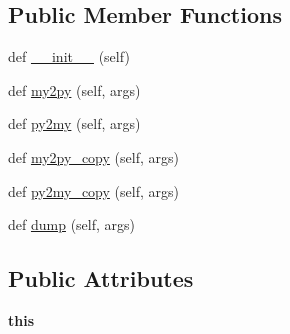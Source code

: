 \subsection*{Public Member Functions}
\begin{DoxyCompactItemize}
\item 
def \hyperlink{classMontePython__cxx_1_1Convert__QickArray_a248fc9cad31385be9c478b1db0440e61}{\+\_\+\+\_\+init\+\_\+\+\_\+} (self)
\item 
def \hyperlink{classMontePython__cxx_1_1Convert__QickArray_a6042af47f1612c75887d899e3394988b}{my2py} (self, args)
\item 
def \hyperlink{classMontePython__cxx_1_1Convert__QickArray_a94d162d20ff1ada746f3449a7b84cb48}{py2my} (self, args)
\item 
def \hyperlink{classMontePython__cxx_1_1Convert__QickArray_aaf24ae72722f9469a90a6f7ef554ac4a}{my2py\+\_\+copy} (self, args)
\item 
def \hyperlink{classMontePython__cxx_1_1Convert__QickArray_a8c8bf46bde047728d8138ef632d31ad5}{py2my\+\_\+copy} (self, args)
\item 
def \hyperlink{classMontePython__cxx_1_1Convert__QickArray_a053da60df844cd2ff8b7264dd3416b7a}{dump} (self, args)
\end{DoxyCompactItemize}
\subsection*{Public Attributes}
\begin{DoxyCompactItemize}
\item 
\hypertarget{classMontePython__cxx_1_1Convert__QickArray_a8a2c164191969f58e9c2162b2a5f9a6f}{}{\bfseries this}\label{classMontePython__cxx_1_1Convert__QickArray_a8a2c164191969f58e9c2162b2a5f9a6f}

\end{DoxyCompactItemize}
